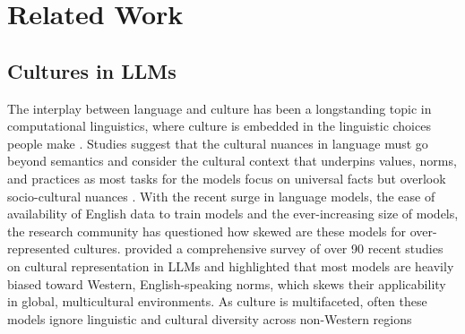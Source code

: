 \section{Related Work}

\subsection{Cultures in LLMs}
The interplay between language and culture has been a longstanding topic in computational linguistics, where culture is embedded in the linguistic choices people make \citep{kasper2010language}. Studies suggest that the cultural nuances in language must go beyond semantics and consider the cultural context that underpins values, norms, and practices as most tasks for the models focus on universal facts but overlook socio-cultural nuances \citep{huang-yang-2023-culturally, nguyen2023extracting}. With the recent surge in language models, the ease of availability of English data to train models and the ever-increasing size of models, the research community has questioned how skewed are these models for over-represented cultures. \citet{adilazuarda2024towards} provided a comprehensive survey of over 90 recent studies on cultural representation in LLMs and highlighted that most models are heavily biased toward Western, English-speaking norms, which skews their applicability in global, multicultural environments. As culture is multifaceted, often these models ignore linguistic and cultural diversity across non-Western regions \citep{dwivedi2023eticor, hershcovich-etal-2022-challenges, wibowo2023copal}
 
 

